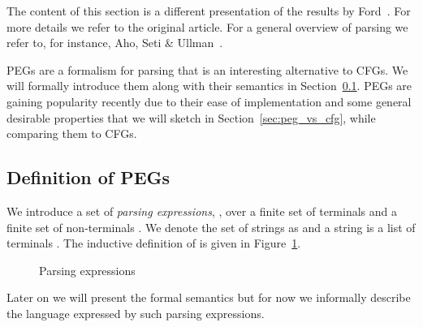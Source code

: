 \documentclass{LMCS}
\newcommand{\defqed}{\hfill\vspace{1ex}}
\theoremstyle{definition}
\begin{document}
The content of this section is a different presentation of the 
results by Ford~\cite{For04}. For more details we refer to the original article.
For a general overview of parsing we refer to, for instance, Aho, Seti \& Ullman~\cite{AhoEA86}.

PEGs are a formalism for parsing that is an interesting alternative to 
CFGs. We will formally introduce them along with their semantics in
Section~\ref{sec:peg_def}. PEGs are gaining popularity recently due to 
their ease of implementation and some general desirable properties that 
we will sketch in Section~\ref{sec:peg_vs_cfg}, while comparing them to CFGs.

\subsection{Definition of PEGs}\label{sec:peg_def}

\begin{defi}\label{pexp}
We introduce a set of \emph{parsing expressions}, , over a finite
set of terminals  and a finite set of non-terminals . 
We denote the set of strings as  and a string  
is a list of terminals .
The inductive definition of  is given in Figure~\ref{peg-exp-fig}.
\defqed
\end{defi}

\begin{figure}[t!]
\begin{center}

\end{center}
\caption{Parsing expressions}
\label{peg-exp-fig}
\end{figure}

Later on we will present the formal semantics but 
for now we informally describe the language expressed by such parsing expressions.
\end{document}
